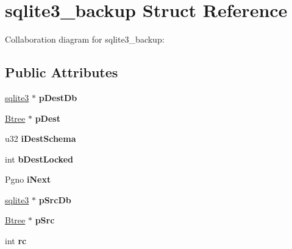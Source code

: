 \hypertarget{structsqlite3__backup}{}\section{sqlite3\+\_\+backup Struct Reference}
\label{structsqlite3__backup}


Collaboration diagram for sqlite3\+\_\+backup\+:
\subsection*{Public Attributes}
\begin{DoxyCompactItemize}
\item 
\hyperlink{structsqlite3}{sqlite3} $\ast$ {\bfseries p\+Dest\+Db}\hypertarget{structsqlite3__backup_ad9b5074a860e01b31bbf9cb27f3808d9}{}\label{structsqlite3__backup_ad9b5074a860e01b31bbf9cb27f3808d9}

\item 
\hyperlink{structBtree}{Btree} $\ast$ {\bfseries p\+Dest}\hypertarget{structsqlite3__backup_a9e011336a89274f0ebfefdcede198f71}{}\label{structsqlite3__backup_a9e011336a89274f0ebfefdcede198f71}

\item 
u32 {\bfseries i\+Dest\+Schema}\hypertarget{structsqlite3__backup_a3f294f50b4ef206452dddd14f2a7cf6a}{}\label{structsqlite3__backup_a3f294f50b4ef206452dddd14f2a7cf6a}

\item 
int {\bfseries b\+Dest\+Locked}\hypertarget{structsqlite3__backup_aa0d385678bc5c3fd4da4201ff03a5856}{}\label{structsqlite3__backup_aa0d385678bc5c3fd4da4201ff03a5856}

\item 
Pgno {\bfseries i\+Next}\hypertarget{structsqlite3__backup_a92454bf354f928aade2b2f92e6cfd088}{}\label{structsqlite3__backup_a92454bf354f928aade2b2f92e6cfd088}

\item 
\hyperlink{structsqlite3}{sqlite3} $\ast$ {\bfseries p\+Src\+Db}\hypertarget{structsqlite3__backup_a0bcc0528bb3f5ec52eb40c3e7a4f7adc}{}\label{structsqlite3__backup_a0bcc0528bb3f5ec52eb40c3e7a4f7adc}

\item 
\hyperlink{structBtree}{Btree} $\ast$ {\bfseries p\+Src}\hypertarget{structsqlite3__backup_aa48f873d1de446638ff71fdae606e672}{}\label{structsqlite3__backup_aa48f873d1de446638ff71fdae606e672}

\item 
int {\bfseries rc}\hypertarget{structsqlite3__backup_aab860dbed6181702b4c6b80d43cde411}{}\label{structsqlite3__backup_aab860dbed6181702b4c6b80d43cde411}


\end{DoxyCompactItemize}
